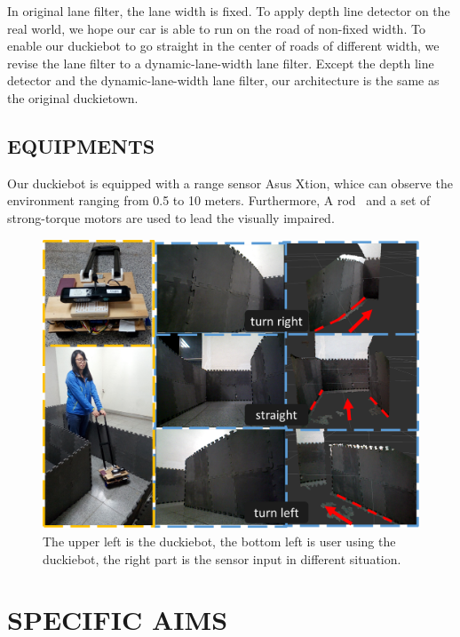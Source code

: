 \documentclass[letterpaper, 10 pt, conference]{ieeeconf}  %
\begin{document}
In original lane filter, the lane width is fixed. To apply depth line detector on the real world, we hope our car is able to run on the road of non-fixed width. To enable our duckiebot to go straight in the center of roads of different width, we revise the lane filter to a dynamic-lane-width lane filter. Except the depth line detector and the dynamic-lane-width lane filter, our architecture is the same as the original duckietown.


\subsection{EQUIPMENTS} 

Our duckiebot is equipped with a range sensor Asus Xtion, whice can observe the environment ranging from 0.5 to 10 meters. Furthermore, A rod~\cite{wei2014guide} and a set of strong-torque motors are used to lead the visually impaired.

\begin{figure}[t] %
\includegraphics[width=1.0\columnwidth]{teaser.png}
\centering
\caption{The upper left is the duckiebot, the bottom left is user using the duckiebot, the right part is the sensor input in different situation.}
\end{figure}

\section{SPECIFIC AIMS}
\end{document}
